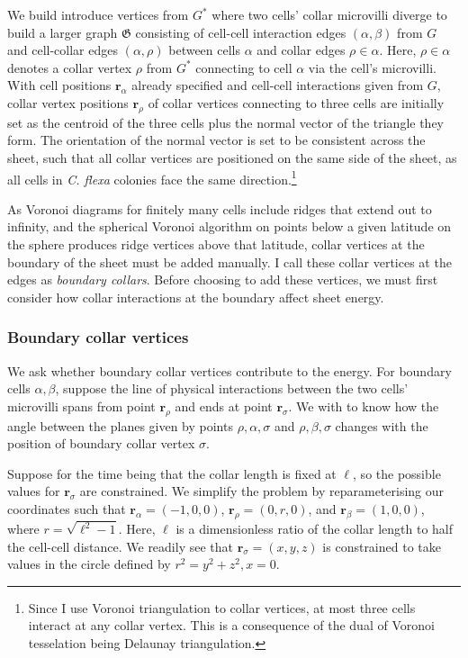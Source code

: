 We build introduce vertices from $G^*$ where two cells' collar microvilli diverge to build a larger graph $\mathfrak{G}$ consisting of cell-cell interaction edges $(\alpha, \beta)$ from $G$ and cell-collar edges $(\alpha, \rho)$ between cells $\alpha$ and collar edges $\rho \in \alpha$. 
Here, $\rho \in \alpha$ denotes a collar vertex $\rho$ from $G^*$ connecting to cell $\alpha$ via the cell's microvilli. 
With cell positions $\bm{r}_\alpha$ already specified and cell-cell interactions given from $G$, collar vertex positions $\bm{r}_\rho$ of collar vertices connecting to three cells are initially set as the centroid of the three cells plus the normal vector of the triangle they form. 
The orientation of the normal vector is set to be consistent across the sheet, such that all collar vertices are positioned on the same side of the sheet, as all cells in \textit{C. flexa} colonies face the same direction.\footnote{Since I use Voronoi triangulation to collar vertices, at most three cells interact at any collar vertex. This is a consequence of the dual of Voronoi tesselation being Delaunay triangulation.}

As Voronoi diagrams for finitely many cells include ridges that extend out to infinity, and the spherical Voronoi algorithm on points below a given latitude on the sphere produces ridge vertices above that latitude, collar vertices at the boundary of the sheet must be added manually. 
I call these collar vertices at the edges as \textit{boundary collars}. Before choosing to add these vertices, we must first consider how collar interactions at the boundary affect sheet energy.


\subsubsection{Boundary collar vertices} \label{subsubsec:bdary_verts}

We ask whether boundary collar vertices contribute to the energy. 
For boundary cells $\alpha, \beta$, suppose the line of physical interactions between the two cells' microvilli spans from point $\bm{r}_\rho$  and ends at point $\bm{r}_\sigma$. 
We with to know how the angle between the planes given by points $\rho, \alpha, \sigma$ and $\rho, \beta, \sigma$ changes with the position of boundary collar vertex $\sigma$. 

Suppose for the time being that the collar length is fixed at $\ell$, so the possible values for $\bm{r}_\sigma$ are constrained. 
We simplify the problem by reparameterising our coordinates such that $\bm{r}_\alpha = (-1, 0, 0)$, $\bm{r}_\rho = (0, r, 0)$, and $\bm{r}_\beta = (1, 0, 0)$, where $r = \sqrt{\ell^2 - 1}$. 
Here, $\ell$ is a dimensionless ratio of the collar length to half the cell-cell distance. 
We readily see that $\bm{r}_\sigma = (x, y, z)$ is constrained to take values in the circle defined by $r^2 = y^2 + z^2, x=0$. 

